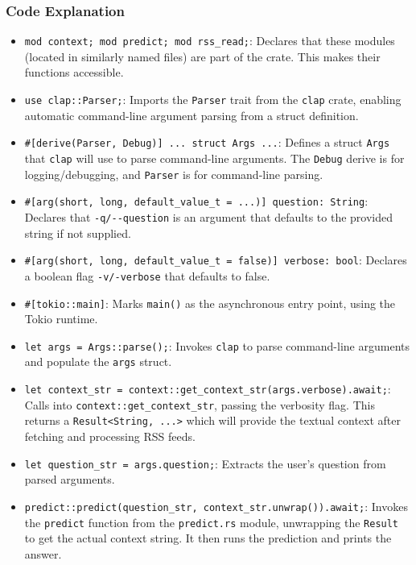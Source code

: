 \subsubsection{Code Explanation}
\begin{itemize}
    \item \lstinline{mod context; mod predict; mod rss_read;}: Declares that these modules (located in similarly named files) are part of the crate. This makes their functions accessible.
    \item \lstinline{use clap::Parser;}: Imports the \lstinline{Parser} trait from the \lstinline{clap} crate, enabling automatic command-line argument parsing from a struct definition.
    \item \lstinline{#[derive(Parser, Debug)] ... struct Args ...}: Defines a struct \lstinline{Args} that \lstinline{clap} will use to parse command-line arguments. The \lstinline{Debug} derive is for logging/debugging, and \lstinline{Parser} is for command-line parsing.
    \item \lstinline{#[arg(short, long, default_value_t = ...)] question: String}: Declares that \lstinline{-q/--question} is an argument that defaults to the provided string if not supplied.
    \item \lstinline{#[arg(short, long, default_value_t = false)] verbose: bool}: Declares a boolean flag \lstinline{-v/-verbose} that defaults to false.
    \item \lstinline{#[tokio::main]}: Marks \lstinline{main()} as the asynchronous entry point, using the Tokio runtime.
    \item \lstinline{let args = Args::parse();}: Invokes \lstinline{clap} to parse command-line arguments and populate the \lstinline{args} struct.
    \item \lstinline{let context_str = context::get_context_str(args.verbose).await;}: Calls into \lstinline{context::get_context_str}, passing the verbosity flag. This returns a \lstinline{Result<String, ...>} which will provide the textual context after fetching and processing RSS feeds.
    \item \lstinline{let question_str = args.question;}: Extracts the user’s question from parsed arguments.
    \item \lstinline{predict::predict(question_str, context_str.unwrap()).await;}: Invokes the \lstinline{predict} function from the \lstinline{predict.rs} module, unwrapping the \lstinline{Result} to get the actual context string. It then runs the prediction and prints the answer.
\end{itemize}

